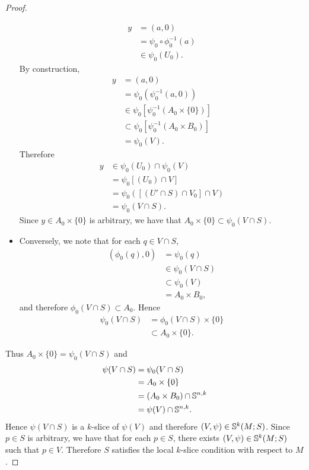 \documentclass{book}
\begin{document}
\begin{proof}
\begin{itemize}
\begin{align*}
				y
				& = (a, 0) \\
				& = \psi_0 \circ \phi_0^{-1}(a) \\
				& \in \psi_0(U_0).
			\end{align*} 
			By construction,
			\begin{align*}
				y
				& = (a, 0) \\
				& = \psi_0(\psi_0^{-1}(a,0)) \\
				& \in \psi_0[\psi_0^{-1}(A_0 \times \{0\})] \\
				& \subset \psi_0[\psi_0^{-1}(A_0 \times B_0)] \\
				& = \psi_0(V) .
			\end{align*}
			Therefore 
			\begin{align*}
				y
				& \in \psi_0(U_0) \cap \psi_0(V)  \\
				& = \psi_0[(U_0) \cap V] \\
				& = \psi_0([(U' \cap S) \cap V_0] \cap V) \\
				& = \psi_0(V \cap S).
			\end{align*}
			Since $y \in A_0 \times \{0\}$ is arbitrary, we have that $A_0 \times \{0\} \subset \psi_0(V \cap S)$.  
			\item Conversely, we note that for each $q \in V \cap S$, 
			\begin{align*}
				(\phi_0(q), 0)
				& =  \psi_0(q) \\
				& \in \psi_0(V \cap S) \\
				& \subset \psi_0(V) \\
				& = A_0 \times B_0, 
			\end{align*}
			and therefore $\phi_0(V \cap S) \subset A_0$. Hence 
			\begin{align*}
				\psi_0(V \cap S)
				& = \phi_0(V \cap S) \times \{0\} \\
				& \subset A_0 \times \{0\}.
			\end{align*}
		\end{itemize}
		Thus $A_0 \times \{0\} = \psi_0(V \cap S)$ and 
		\begin{align*}
			\psi(V \cap S)
			& = \psi_0(V \cap S) \\
			& = A_0 \times \{0\} \\
			& = (A_0 \times B_0) \cap \S^{n,k} \\
			& = \psi(V) \cap \S^{n,k}.
		\end{align*}
		Hence $\psi(V \cap S)$ is a $k$-slice of $\psi(V)$ and therefore $(V, \psi) \in \S^k(M; S)$. Since $p \in S$ is arbitrary, we have that for each $p \in S$, there exists $(V, \psi) \in \S^k(M; S)$ such that $p \in V$. Therefore $S$ satisfies the local $k$-slice condition with respect to $M$. 
	\end{proof}
\end{document}
